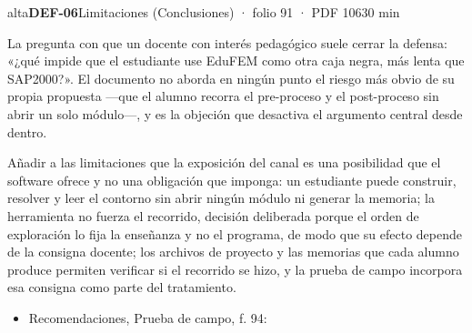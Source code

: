 \begin{ficha}{alta}{\casilla\textbf{DEF-06}\quad{}\quad Limitaciones (Conclusiones) · folio 91 · PDF 106\hfill 30 min}
\par
{}La pregunta con que un docente con interés pedagógico suele cerrar la defensa: «¿qué impide que el estudiante use EduFEM como otra caja negra, más lenta que SAP2000?». El documento no aborda en ningún punto el riesgo más obvio de su propia propuesta —que el alumno recorra el pre-proceso y el post-proceso sin abrir un solo módulo—, y es la objeción que desactiva el argumento central desde dentro.\par
{}Añadir a las limitaciones que la exposición del canal es una posibilidad que el software ofrece y no una obligación que imponga: un estudiante puede construir, resolver y leer el contorno sin abrir ningún módulo ni generar la memoria; la herramienta no fuerza el recorrido, decisión deliberada porque el orden de exploración lo fija la enseñanza y no el programa, de modo que su efecto depende de la consigna docente; los archivos de proyecto y las memorias que cada alumno produce permiten verificar si el recorrido se hizo, y la prueba de campo incorpora esa consigna como parte del tratamiento.\par
{}\begin{itemize}[leftmargin=1.2em,itemsep=1pt,topsep=1pt]
\item {\small Recomendaciones, Prueba de campo, f. 94: }
\end{itemize}
\end{ficha}
